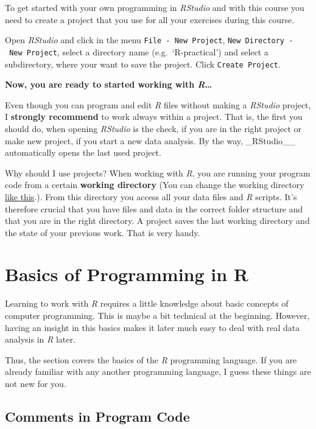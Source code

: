 \documentclass[
]{scrartcl}
\makeatletter
\newenvironment{kframe}{%
\medskip{}
\setlength{\fboxsep}{.8em}
 \def\at@end@of@kframe{}%
 \ifinner\ifhmode%
  \def\at@end@of@kframe{\end{minipage}}%
  \begin{minipage}{\columnwidth}%
 \fi\fi%
 \def\FrameCommand##1{\hskip\@totalleftmargin \hskip-\fboxsep
 \colorbox{shadecolor}{##1}\hskip-\fboxsep
     \hskip-\linewidth \hskip-\@totalleftmargin \hskip\columnwidth}%
 \MakeFramed {\advance\hsize-\width
   \@totalleftmargin\z@ \linewidth\hsize
   \@setminipage}}%
 {\par\unskip\endMakeFramed%
 \at@end@of@kframe}
\newenvironment{rmdblock}[1]
  {
  \begin{itemize}
  \renewcommand{\labelitemi}{
    \raisebox{-.7\height}[0pt][0pt]{
      {\setkeys{Gin}{width=3em,keepaspectratio}\texttt{[image: images/\#1]}}
    }
  }
  \setlength{\fboxsep}{1em}
  \begin{kframe}
  \item
  }
  {
  \end{kframe}
  \end{itemize}
  }
\newenvironment{myexercise}
    {\begin{rmdblock}{exercise_green}}
    {\end{rmdblock}}
\makeatother
\begin{document}
To get started with your own programming in \emph{RStudio} and with this course you need to create a project that you use for all your exercises during this course.

\begin{myexercise}
Open \emph{RStudio} and click in the menu
\texttt{File\ -\ New\ Project},
\texttt{New\ Directory\ -\ New\ Project}, select a directory name
(e.g.~`R-practical') and select a subdirectory, where your want to save
the project. Click \texttt{Create\ Project}.
\end{myexercise}

\textbf{Now, you are ready to started working with \emph{R}\ldots{}}

Even though you can program and edit \emph{R} files without making a \emph{RStudio} project, I \textbf{strongly recommend} to work always within a project. That is, the first you should do, when opening \emph{RStudio} is the check, if you are in the right project or make new project, if you start a new data analysis. By the way, \_RStudio\_\_ automatically opens the last used project.

Why should I use projects? When working with \emph{R}, you are running your program code from a certain \textbf{working directory} (You can change the working directory \href{https://www.youtube.com/watch?v=LNw6hzGgyxM}{like this}.). From this directory you access all your data files and \emph{R} scripts. It's therefore crucial that you have files and data in the correct folder structure and that you are in the right directory. A project saves the last working directory and the state of your previous work. That is very handy.

\hypertarget{basics}{%
\section{Basics of Programming in R}\label{basics}}

Learning to work with \emph{R} requires a little knowledge about basic concepts of computer programming. This is maybe a bit technical at the beginning. However, having an insight in this basics makes it later much easy to deal with real data analysis in \emph{R} later.

Thus, the section covers the basics of the \emph{R} programming language. If you are already familiar with any another programming language, I guess these things are not new for you.

\hypertarget{comments-in-program-code}{%
\subsection{Comments in Program Code}\label{comments-in-program-code}}
\end{document}
